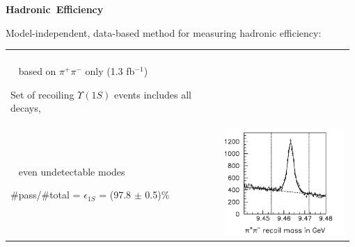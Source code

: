 \documentclass[landscape]{article}
\newenvironment{slide}[1][ ]{\mbox{\bf #1 } \vfill}{\vfill \mbox{ } \pagebreak}
\begin{document}
\begin{slide}[Hadronic Efficiency]

\renewcommand{\labelitemi}{}

\vspace{0.5 cm}

  Model-independent, data-based method for measuring hadronic
    efficiency:

\vspace{0.5 cm}

    \begin{tabular}{p{0.6\linewidth} c p{0.38\linewidth}}
      \hspace{-1 cm}\begin{minipage}{\linewidth}
	\vspace{1 cm}
        \begin{itemize}\setlength{\itemsep}{0.7 cm}

          \item Select \mbox{$\Upsilon(2S) \to \pi^+ \pi^- \ \Upsilon(1S)$} \\ \mbox{ } \hfill based on $\pi^+ \pi^-$ only (1.3 fb$^{-1}$)

          \item Set of recoiling $\Upsilon(1S)$ events 
	    includes all decays, \\ \mbox{ } \hfill even undetectable modes

          \item \#pass/\#total = $\epsilon_{1S}$ = (97.8 $\pm$ 0.5)\%

        \end{itemize}
      \end{minipage} & & \begin{minipage}{\linewidth}
	\vspace{0.5 cm}
	\includegraphics[width=\linewidth]{prettied_plenary_justpipimass}


\end{minipage}
\end{tabular}
\end{slide}
\end{document}
